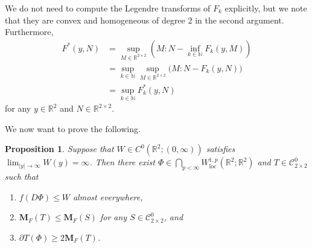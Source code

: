 \documentclass[a4paper]{article}
\newcommand{\R}{\mathbb{R}}
\newcommand{\N}{\mathbb{N}}
\newcommand{\M}{\mathbf{M}}
\newcommand{\loc}{\mathrm{loc}}
\newcommand{\ncrt}{\mathcal{C}}
\newtheorem{proposition}[theorem]{Proposition}
\theoremstyle{definition}
\theoremstyle{remark}
\begin{document}
We do not need to compute the Legendre transforms of $F_k$ explicitly,
but we note that they are convex and homogeneous of degree $2$ in the second argument.
Furthermore,
\[
\begin{split}
F^*(y, N) & = \sup_{M \in \R^{2 \times 2}} \left(M : N - \inf_{k \in \N} F_k(y, M)\right) \\
& = \sup_{k \in \N} \sup_{M \in \R^{2 \times 2}} \bigl(M : N - F_k(y, N)\bigr) \\
& = \sup_{k \in \N} F_k^*(y, N)
\end{split}
\]
for any $y \in \R^2$ and $N \in \R^{2 \times 2}$.

We now want to prove the following.

\begin{proposition} \label{prp:existence-of-calibration-and-current}
Suppose that $W \in C^0(\R^2; (0, \infty))$ satisfies $\lim_{|y| \to \infty} W(y) = \infty$.
Then there exist $\Phi \in \bigcap_{p < \infty} W_\loc^{1, p}(\R^2; \R^2)$ and $T \in \ncrt_{2 \times 2}^0$
such that
\begin{enumerate}
\item $f(D\Phi) \le W$ almost everywhere,
\item $\M_F(T) \le \M_F(S)$ for any $S \in \ncrt_{2 \times 2}^0$, and
\item $\partial T(\Phi) \ge 2\M_F(T)$.
\end{enumerate}
\end{proposition}
\end{document}
